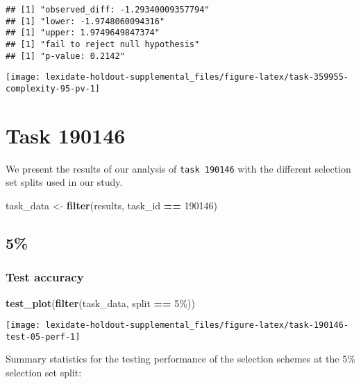 \documentclass[
]{book}
\newenvironment{Shaded}{\begin{snugshade}}{\end{snugshade}}
\newcommand{\DecValTok}[1]{\textcolor[rgb]{0.00,0.00,0.81}{#1}}
\newcommand{\FunctionTok}[1]{\textcolor[rgb]{0.13,0.29,0.53}{\textbf{#1}}}
\newcommand{\NormalTok}[1]{#1}
\newcommand{\OtherTok}[1]{\textcolor[rgb]{0.56,0.35,0.01}{#1}}
\newcommand{\SpecialCharTok}[1]{\textcolor[rgb]{0.81,0.36,0.00}{\textbf{#1}}}
\newcommand{\StringTok}[1]{\textcolor[rgb]{0.31,0.60,0.02}{#1}}
\begin{document}
\begin{verbatim}
## [1] "observed_diff: -1.29340009357794"
## [1] "lower: -1.9748060094316"
## [1] "upper: 1.9749649847374"
## [1] "fail to reject null hypothesis"
## [1] "p-value: 0.2142"
\end{verbatim}

\texttt{[image: lexidate-holdout-supplemental\_files/figure-latex/task-359955-complexity-95-pv-1]}

\hypertarget{task-190146}{%
\chapter{Task 190146}\label{task-190146}}

We present the results of our analysis of \texttt{task\ 190146} with the different selection set splits used in our study.

\begin{Shaded}
\begin{Highlighting}[]
\NormalTok{task\_data }\OtherTok{\textless{}{-}} \FunctionTok{filter}\NormalTok{(results, task\_id }\SpecialCharTok{==} \DecValTok{190146}\NormalTok{)}
\end{Highlighting}
\end{Shaded}

\hypertarget{section-15}{%
\section{5\%}\label{section-15}}

\hypertarget{test-accuracy-15}{%
\subsection{Test accuracy}\label{test-accuracy-15}}

\begin{Shaded}
\begin{Highlighting}[]
\FunctionTok{test\_plot}\NormalTok{(}\FunctionTok{filter}\NormalTok{(task\_data, split }\SpecialCharTok{==} \StringTok{\textquotesingle{}5\%\textquotesingle{}}\NormalTok{))}
\end{Highlighting}
\end{Shaded}

\texttt{[image: lexidate-holdout-supplemental\_files/figure-latex/task-190146-test-05-perf-1]}

Summary statistics for the testing performance of the selection schemes at the 5\% selection set split:
\end{document}

